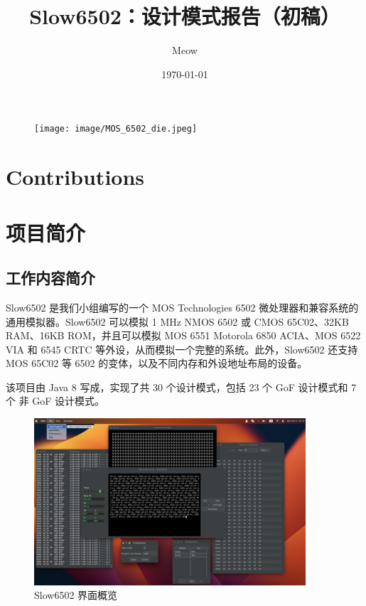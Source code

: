 \documentclass[cn,black,12pt,normal]{elegantnote}
\title{Slow6502：设计模式报告（初稿）}
\author{Meow}
\institute{软件学院}
\date{\today}
\begin{document}
\maketitle

\begin{figure}[H]
    \centering
    \texttt{[image: image/MOS\_6502\_die.jpeg]}
\end{figure}

\newpage
\section*{Contributions}



\newpage

\tableofcontents

\newpage

\section{项目简介}

\subsection{工作内容简介}

Slow6502 是我们小组编写的一个 MOS Technologies 6502 微处理器和兼容系统的通用模拟器。Slow6502 可以模拟 1 MHz NMOS 6502 或 CMOS 65C02、32KB RAM、16KB ROM，并且可以模拟 MOS 6551 Motorola 6850 ACIA、MOS 6522 VIA 和 6545 CRTC 等外设，从而模拟一个完整的系统。此外，Slow6502 还支持 MOS 65C02 等 6502 的变体，以及不同内存和外设地址布局的设备。

该项目由 Java 8 写成，实现了共 30 个设计模式，包括 23 个 GoF 设计模式和 7 个 非 GoF 设计模式。

\begin{figure}[H]
  \centering
  \includegraphics[width=0.9\textwidth]{image/Slow6502UI.jpg}
  \caption{Slow6502 界面概览}
\end{figure}
\end{document}
